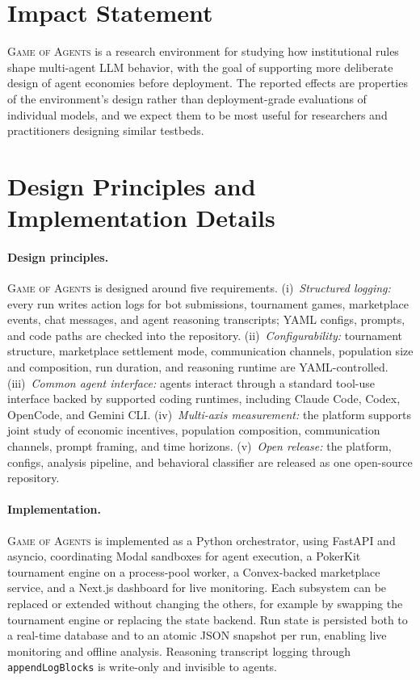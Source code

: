 \documentclass{article}
\newcommand{\goa}{\textsc{Game of Agents}}
\begin{document}
\section*{Impact Statement}
\goa{} is a research environment for studying how institutional rules shape multi-agent LLM behavior, with the goal of supporting more deliberate design of agent economies before deployment.
The reported effects are properties of the environment's design rather than deployment-grade evaluations of individual models, and we expect them to be most useful for researchers and practitioners designing similar testbeds.





\clearpage
\appendix

\section{Design Principles and Implementation Details}
\label{app:design}

\paragraph{Design principles.}
\goa{} is designed around five requirements. (i)~\emph{Structured logging:} every run writes action logs for bot submissions, tournament games, marketplace events, chat messages, and agent reasoning transcripts; YAML configs, prompts, and code paths are checked into the repository. (ii)~\emph{Configurability:} tournament structure, marketplace settlement mode, communication channels, population size and composition, run duration, and reasoning runtime are YAML-controlled. (iii)~\emph{Common agent interface:} agents interact through a standard tool-use interface backed by supported coding runtimes, including Claude Code, Codex, OpenCode, and Gemini CLI.
(iv)~\emph{Multi-axis measurement:} the platform supports joint study of economic incentives, population composition, communication channels, prompt framing, and time horizons.
(v)~\emph{Open release:} the platform, configs, analysis pipeline, and behavioral classifier are released as one open-source repository.

\paragraph{Implementation.}
\goa{} is implemented as a Python orchestrator, using FastAPI and asyncio, coordinating Modal sandboxes for agent execution, a PokerKit tournament engine on a process-pool worker, a Convex-backed marketplace service, and a Next.js dashboard for live monitoring.
Each subsystem can be replaced or extended without changing the others, for example by swapping the tournament engine or replacing the state backend.
Run state is persisted both to a real-time database and to an atomic JSON snapshot per run, enabling live monitoring and offline analysis.
Reasoning transcript logging through \texttt{appendLogBlocks} is write-only and invisible to agents.
\end{document}
